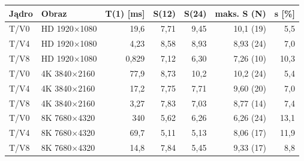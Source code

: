 \begin{tabular}{llrrrrr}
\toprule
Jądro & Obraz & T(1) [ms] & S(12) & S(24) & maks. S (N) & s [\%] \\
\midrule
T/V0 & HD 1920$\times$1080 & 19,6 & 7,71 & 9,45 & 10,1 (19) & 5,5 \\
T/V4 & HD 1920$\times$1080 & 4,23 & 8,58 & 8,93 & 8,93 (24) & 7,0 \\
T/V8 & HD 1920$\times$1080 & 0,829 & 7,12 & 6,30 & 7,26 (10) & 10,3 \\
T/V0 & 4K 3840$\times$2160 & 77,9 & 8,73 & 10,2 & 10,2 (24) & 5,4 \\
T/V4 & 4K 3840$\times$2160 & 17,2 & 7,75 & 7,71 & 9,60 (20) & 7,0 \\
T/V8 & 4K 3840$\times$2160 & 3,27 & 7,83 & 7,03 & 8,77 (14) & 7,4 \\
T/V0 & 8K 7680$\times$4320 & 340 & 5,62 & 6,26 & 6,26 (24) & 13,1 \\
T/V4 & 8K 7680$\times$4320 & 69,7 & 5,11 & 5,13 & 8,06 (17) & 11,9 \\
T/V8 & 8K 7680$\times$4320 & 14,8 & 7,84 & 5,45 & 9,33 (17) & 8,8 \\
\bottomrule
\end{tabular}
